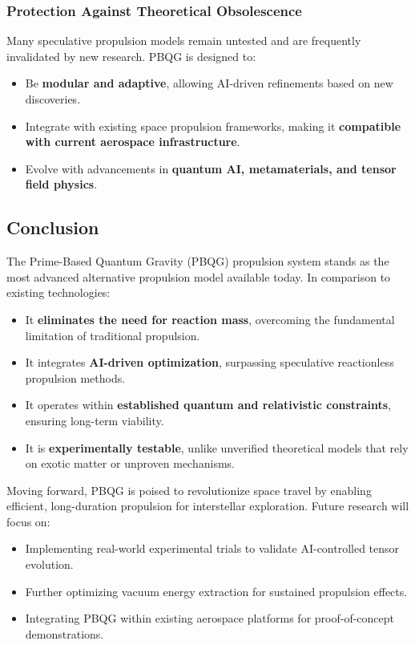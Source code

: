\documentclass{article}
\theoremstyle{plain}
\begin{document}
\subsubsection{Protection Against Theoretical Obsolescence}
Many speculative propulsion models remain untested and are frequently invalidated by new research. PBQG is designed to:
\begin{itemize}
    \item Be \textbf{modular and adaptive}, allowing AI-driven refinements based on new discoveries.
    \item Integrate with existing space propulsion frameworks, making it \textbf{compatible with current aerospace infrastructure}.
    \item Evolve with advancements in \textbf{quantum AI, metamaterials, and tensor field physics}.
\end{itemize}

\subsection{Conclusion}
\label{subsec:competitive_conclusion}

The Prime-Based Quantum Gravity (PBQG) propulsion system stands as the most advanced alternative propulsion model available today. In comparison to existing technologies:
\begin{itemize}
    \item It \textbf{eliminates the need for reaction mass}, overcoming the fundamental limitation of traditional propulsion.
    \item It integrates \textbf{AI-driven optimization}, surpassing speculative reactionless propulsion methods.
    \item It operates within \textbf{established quantum and relativistic constraints}, ensuring long-term viability.
    \item It is \textbf{experimentally testable}, unlike unverified theoretical models that rely on exotic matter or unproven mechanisms.
\end{itemize}

Moving forward, PBQG is poised to revolutionize space travel by enabling efficient, long-duration propulsion for interstellar exploration. Future research will focus on:
\begin{itemize}
    \item Implementing real-world experimental trials to validate AI-controlled tensor evolution.
    \item Further optimizing vacuum energy extraction for sustained propulsion effects.
    \item Integrating PBQG within existing aerospace platforms for proof-of-concept demonstrations.
\end{itemize}
\end{document}
